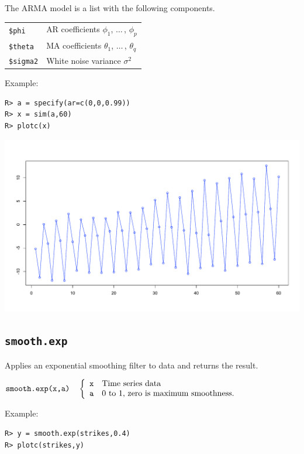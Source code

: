 \documentclass[11pt]{article}
\begin{document}
%
\bigskip
\noindent
The ARMA model is a list with the following components.

\begin{center}
\begin{tabular}{ll}
{\tt \$phi} & AR coefficients $\phi_1$, $\ldots\,$, $\phi_p$\\
{\tt \$theta} & MA coefficients $\theta_1$, $\ldots\,$, $\theta_q$\\
{\tt \$sigma2} & White noise variance $\sigma^2$
\end{tabular}
\end{center}

\noindent
Example:
\begin{verbatim}
R> a = specify(ar=c(0,0,0.99))
R> x = sim(a,60)
R> plotc(x)
\end{verbatim}

\begin{center}
\includegraphics[scale=0.3]{Rplot-24.pdf}
\end{center}

\newpage

\subsection{\tt smooth.exp}
Applies an exponential smoothing filter to data and returns the result.

\bigskip
$
\hbox{\tt smooth.exp(x,a)}\quad\left\{\begin{array}{ll}
{\tt x} & \hbox{Time series data}\\
{\tt a} & \hbox{0 to 1, zero is maximum smoothness.}
\end{array}\right.
$

\bigskip
\noindent
Example:

\begin{verbatim}
R> y = smooth.exp(strikes,0.4)
R> plotc(strikes,y)
\end{verbatim}
\end{document}
